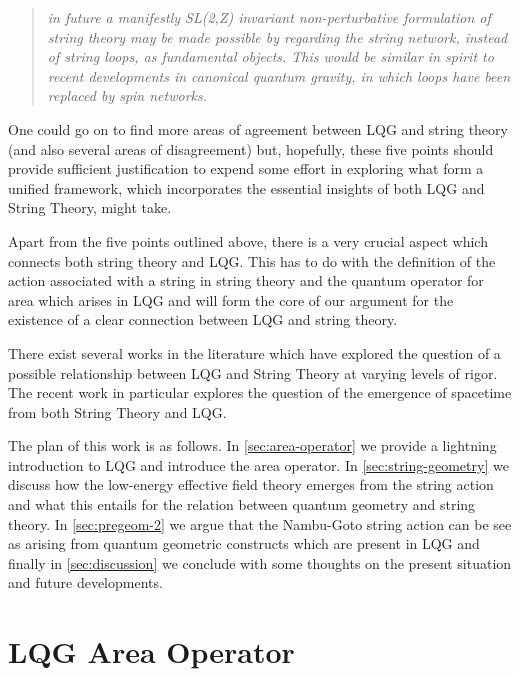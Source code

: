 \documentclass[submission, Phys]{SciPost}
\begin{document}
\begin{enumerate}
	\begin{quote}
		\emph{in future a manifestly SL(2,Z) invariant non-perturbative formulation of string theory may be made possible by regarding the string network, instead of string loops, as fundamental objects. This would be similar in spirit to recent developments in canonical quantum gravity, in which loops have been replaced by spin networks.}
	\end{quote}
\end{enumerate}

One could go on to find more areas of agreement between LQG and string theory (and also several areas of disagreement) but, hopefully, these five points should provide sufficient justification to expend some effort in exploring what form a unified framework, which incorporates the essential insights of both LQG and String Theory, might take.

Apart from the five points outlined above, there is a very crucial aspect which connects both string theory and LQG. This has to do with the definition of the action associated with a string in string theory and the quantum operator for area which arises in LQG and will form the core of our argument for the existence of a clear connection between LQG and string theory.

There exist several works in the literature \cite{Thiemann2004The-LQG-String:,Gambini2014Emergence,Bodendorfer2015A-note,Cai2017The-String,Smolin1998Strings,Freidel2017Loop,Zuo2016A-note,Zuo2017Simplicity} which have explored the question of a possible relationship between LQG and String Theory at varying levels of rigor. The recent work \cite{Huggett2017The-Atemporal} in particular explores the question of the emergence of spacetime from both String Theory and LQG.

The plan of this work is as follows. In \autoref{sec:area-operator} we provide a lightning introduction to LQG and introduce the area operator. In \autoref{sec:string-geometry} we discuss how the low-energy effective field theory emerges from the string action and what this entails for the relation between quantum geometry and string theory. In \autoref{sec:pregeom-2} we argue that the Nambu-Goto string action can be see as arising from quantum geometric constructs which are present in LQG and finally in \autoref{sec:discussion} we conclude with some thoughts on the present situation and future developments.

\section{LQG Area Operator}\label{sec:area-operator}
\end{document}
